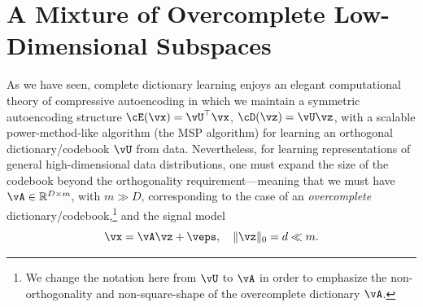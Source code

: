 \documentclass[../../book-main.tex]{subfiles}
\begin{document}
%

\section{A Mixture of Overcomplete Low-Dimensional  Subspaces}
\label{sec:dictionary_learning}
As we have seen, complete dictionary learning enjoys an elegant computational theory of compressive autoencoding in which we maintain a symmetric autoencoding structure $\cE(\vx) = \vU^\top \vx$, $\cD(\vz) = \vU \vz$, with a scalable power-method-like algorithm (the MSP algorithm) for learning an orthogonal dictionary/codebook $\vU$ from data. Nevertheless, for learning representations of general high-dimensional data distributions, one must expand the size of the codebook beyond the orthogonality requirement---meaning that we must have $\vA \in \R^{D \times m}$, with $m \gg D$, corresponding to the case of an \textit{overcomplete} dictionary/codebook,\footnote{We change the notation here from $\vU$ to $\vA$ in order to emphasize the non-orthogonality and non-square-shape of the overcomplete dictionary $\vA$.} and the signal model
\begin{equation}\label{eq:model-DL-overcomplete}
    \vx =  \vA \vz + \veps,
    \quad
    \norm{\vz}_0 = d \ll m.
\end{equation}
\end{document}
